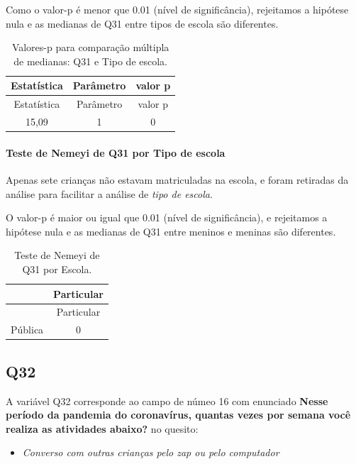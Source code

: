 \documentclass[]{article}
\providecommand{\tightlist}{%
  \setlength{\itemsep}{0pt}\setlength{\parskip}{0pt}}
\let\oldparagraph\paragraph
\renewcommand{\paragraph}[1]{\oldparagraph{#1}\mbox{}}
\begin{document}
Como o valor-p é menor que 0.01 (nível de significância), rejeitamos a hipótese nula e as medianas de Q31 entre tipos de escola são diferentes.

\begin{longtable}[]{@{}ccc@{}}
\caption{\label{tab:unnamed-chunk-1062}Valores-p para comparação múltipla de medianas: Q31 e Tipo de escola.}\tabularnewline
\toprule
Estatística & Parâmetro & valor p\tabularnewline
\midrule
\endfirsthead
\toprule
Estatística & Parâmetro & valor p\tabularnewline
\midrule
\endhead
15,09 & 1 & 0\tabularnewline
\bottomrule
\end{longtable}

\hypertarget{teste-de-nemeyi-de-q31-por-tipo-de-escola}{%
\paragraph{Teste de Nemeyi de Q31 por Tipo de escola}\label{teste-de-nemeyi-de-q31-por-tipo-de-escola}}

Apenas sete crianças não estavam matriculadas na escola, e foram retiradas da análise para facilitar a análise de \emph{tipo de escola}.

O valor-p é maior ou igual que 0.01 (nível de significância), e rejeitamos a hipótese nula e as medianas de Q31 entre meninos e meninas são diferentes.

\begin{longtable}[]{@{}lc@{}}
\caption{\label{tab:unnamed-chunk-1064}Teste de Nemeyi de Q31 por Escola.}\tabularnewline
\toprule
& Particular\tabularnewline
\midrule
\endfirsthead
\toprule
& Particular\tabularnewline
\midrule
\endhead
Pública & 0\tabularnewline
\bottomrule
\end{longtable}

\cleardoublepage

\hypertarget{q32}{%
\subsection{Q32}\label{q32}}

A variável Q32 corresponde ao campo de númeo 16 com enunciado \textbf{Nesse período da pandemia do coronavírus, quantas vezes por semana você realiza as atividades abaixo?} no quesito:

\begin{itemize}
\tightlist
\item
  \emph{Converso com outras crianças pelo zap ou pelo computador}
\end{itemize}
\end{document}
